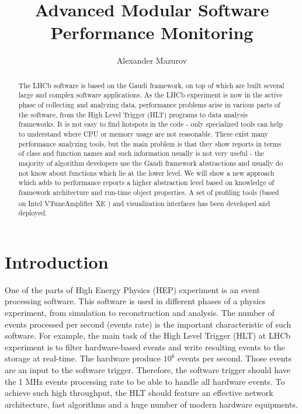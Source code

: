 \documentclass[a4paper]{jpconf}
\begin{document}
\title{Advanced Modular Software Performance Monitoring}

\author{Alexander Mazurov}

\address{CERN, CH-1211 Genève 23, Switzerland}



\newcommand\iamp{{Intel\textsuperscript{\textregistered} VTune\texttrademark Amplifier XE} }
\newcommand\amp{{VTune\texttrademark Amplifier XE} }
\newcommand\intel{{Intel\textsuperscript{\textregistered}} }

\begin{abstract}
The LHCb software is based on the Gaudi framework, on top of which are built several large and complex software applications. As the LHCb experiment is now in the active phase of collecting and analyzing data,  performance problems arise in various parts of the software, from the High Level Trigger (HLT) programs to data analysis frameworks. It is not easy to find hotspots in the code - only specialized tools can help to understand where CPU or memory usage are not reasonable. There exist many performance analyzing tools, but the main problem is that they show reports in terms of class and function names and such information usually is not very useful - the majority of algorithm developers use the Gaudi framework abstractions and usually do not know about functions which lie at the lower level. We will show a new approach which adds to performance reports a higher abstraction level based on knowledge of framework architecture and run-time object properties. A set of profiling tools (based on \iamp) and visualization interfaces has been developed and deployed.
\end{abstract}

\section{Introduction}
One of the parts of High Energy Physics (HEP) experiment is an event processing software. This software is used in different phases of a physics experiment, from simulation to reconstruction and analysis. The number of events  processed per second (events rate)  is the important characteristic of such software. For example, the main task of the High Level Trigger (HLT) at LHCb experiment is to filter hardware-based events and write resulting events to the storage at real-time. The hardware produce $10^6$ events per second. Those events are an input to the software trigger. Therefore, the software trigger should have the 1 MHz events processing rate to be able to handle all hardware  events. To achieve such high throughput, the HLT should feature an effective network architecture, fast algorithms and a huge number of modern hardware equipments.
\end{document}
